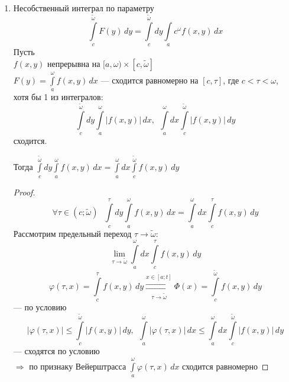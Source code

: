 \begin{properties}
\begin{enumerate}
        \item Несобственный интеграл по параметру
        \[ \int\limits_c^{\tilde \omega} F(y)\,dy = \int\limits_c^{\tilde \omega} dy \int\limits_ac^{\omega} f(x, y)\,dx \]
        Пусть \\
        \phantom{Пусть} $f(x, y)$ непрерывна на $[a, \omega) \times [c, \tilde \omega]$ \\
        \phantom{Пусть} $F(y) = \int\limits_a^{\omega} f(x, y)\,dx$ --- сходится равномерно на $[c, \tau]$, 
        где $c < \tau < \omega$, \\
        \phantom{Пусть} хотя бы 1 из интегралов:
        \[ \int\limits_c^{\tilde \omega} dy \int\limits_a^{\omega} |f(x, y)|\,dx, \ \ 
        \int\limits_a^{\omega} dx \int\limits_c^{\tilde \omega} |f(x, y)|\,dy \]
        \phantom{Пусть} сходится.
        
        Тогда $\int\limits_c^{\tilde \omega} dy \int\limits_a^{\omega} f(x, y)\,dx = 
        \int\limits_a^{\omega} dx \int\limits_c^{\tilde \omega} f(x, y)\,dy$
        \begin{proof}
            \[ \forall \tau \in (c; \tilde \omega) \ \ \ \int\limits_c^{\tau} dy \int\limits_a^{\omega} f(x, y)\,dx = 
            \int\limits_a^{\omega} dx \int\limits_c^{\tau} f(x, y)\,dy \]
            Рассмотрим предельный переход $\tau \to \tilde \omega$:
            \[ \lim_{\tau \to \tilde \omega} \int\limits_a^{\omega} dx \int\limits_c^{\tau} f(x, y)\,dy \]
            \[ \varphi(\tau, x) = \int\limits_c^{\tau} f(x, y)\,dy \overset{x \in [a; t]}{\underset{\tau \to \tilde \omega}
            {\rightrightarrows}} \Phi(x) = \int\limits_c^{\tilde \omega} f(x, y)\,dy \]
            --- по условию
            \[ |\varphi(\tau, x)| \le \int\limits_c^{\tilde \omega} |f(x, y)|\,dy, \ \ \int\limits_a^{\omega} |\varphi(\tau, x)|\,dx
            \le \int\limits_a^{\omega} dx \int\limits_c^{\tilde \omega} |f(x, y)|\,dy \]
            --- сходятся по условию \\
            $\Rightarrow$ по признаку Вейерштрасса $\int\limits_a^{\omega} \varphi(\tau, x)\,dx$ сходится равномерно
        \end{proof}
    \end{enumerate}
    \end{properties}
